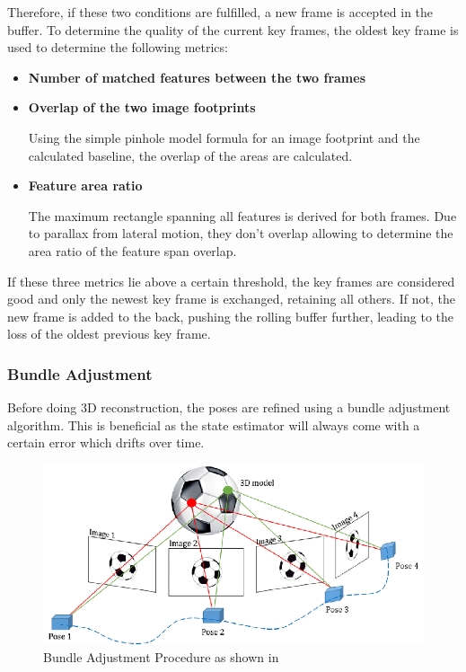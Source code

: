 Therefore, if these two conditions are fulfilled, a new frame is accepted in the buffer. To determine the quality of the current key frames, the oldest key frame is used to determine the following metrics:

\begin{itemize}
    \item \textbf{Number of matched features between the two frames}
    \item \textbf{Overlap of the two image footprints}
    
    Using the simple pinhole model formula for an image footprint and the calculated baseline, the overlap of the areas are calculated.
    \item \textbf{Feature area ratio}
    
    The maximum rectangle spanning all features is derived for both frames. Due to parallax from lateral motion, they don't overlap allowing to determine the area ratio of the feature span overlap.
\end{itemize}

If these three metrics lie above a certain threshold, the key frames are considered good and only the newest key frame is exchanged, retaining all others. If not, the new frame is added to the back, pushing the rolling buffer further, leading to the loss of the oldest previous key frame.

\subsubsection{Bundle Adjustment}

Before doing 3D reconstruction, the poses are refined using a bundle adjustment algorithm. This is beneficial as the state estimator will always come with a certain error which drifts over time. 

\begin{figure}[ht!]
    \centering
    \includegraphics[scale=0.5]{images/system_overview/BA.png}
    \caption{Bundle Adjustment Procedure as shown in \citet{BA}}
    \label{fig:BA}
\end{figure}

